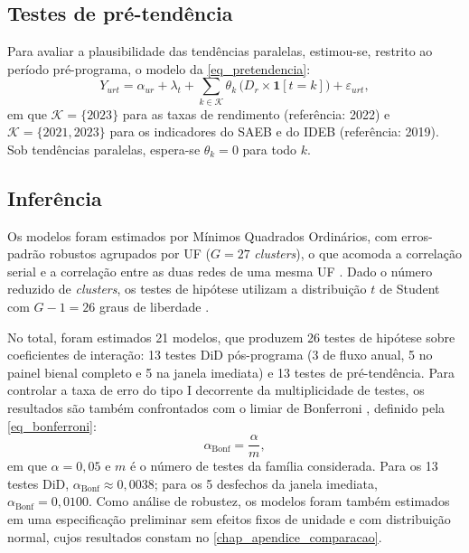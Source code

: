 \subsection{Testes de pré-tendência}
\label{subsec_pretendencia}

Para avaliar a plausibilidade das tendências paralelas, estimou-se, restrito ao período pré-programa, o modelo da \autoref{eq_pretendencia}:
\begin{equation}
    \label{eq_pretendencia}
    Y_{urt} = \alpha_{ur} + \lambda_t + \sum_{k \in \mathcal{K}} \theta_k\,\big(D_r \times \mathbf{1}[t = k]\big) + \varepsilon_{urt},
\end{equation}
em que $\mathcal{K} = \{2023\}$ para as taxas de rendimento (referência: 2022) e $\mathcal{K} = \{2021, 2023\}$ para os indicadores do SAEB e do IDEB (referência: 2019).
Sob tendências paralelas, espera-se $\theta_k = 0$ para todo $k$.

\subsection{Inferência}
\label{subsec_inferencia}

Os modelos foram estimados por Mínimos Quadrados Ordinários, com erros-padrão robustos agrupados por UF ($G = 27$ \textit{clusters}), o que acomoda a correlação serial e a correlação entre as duas redes de uma mesma UF \cite{Bertrand2004}.
Dado o número reduzido de \textit{clusters}, os testes de hipótese utilizam a distribuição $t$ de Student com $G - 1 = 26$ graus de liberdade \cite{Cameron2015}.

No total, foram estimados 21 modelos, que produzem 26 testes de hipótese sobre coeficientes de interação: 13 testes DiD pós-programa (3 de fluxo anual, 5 no painel bienal completo e 5 na janela imediata) e 13 testes de pré-tendência.
Para controlar a taxa de erro do tipo I decorrente da multiplicidade de testes, os resultados são também confrontados com o limiar de Bonferroni \cite{Dunn1961}, definido pela \autoref{eq_bonferroni}:
\begin{equation}
    \label{eq_bonferroni}
    \alpha_{\text{Bonf}} = \frac{\alpha}{m},
\end{equation}
em que $\alpha = 0{,}05$ e $m$ é o número de testes da família considerada.
Para os 13 testes DiD, $\alpha_{\text{Bonf}} \approx 0{,}0038$; para os 5 desfechos da janela imediata, $\alpha_{\text{Bonf}} = 0{,}0100$.
Como análise de robustez, os modelos foram também estimados em uma especificação preliminar sem efeitos fixos de unidade e com distribuição normal, cujos resultados constam no \autoref{chap_apendice_comparacao}.
